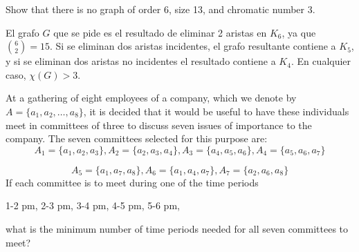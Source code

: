 \documentclass[twoside]{article}
\begin{document}
\newpage

\begin{ejercicio}{3.3}
 Show that there is no graph of order 6, size 13, and chromatic number 3.
\end{ejercicio}
\begin{solucion}
El grafo $G$ que se pide es el resultado de eliminar 2 aristas en $K_6$, ya que $\binom{6}{2}=15$. Si se eliminan dos aristas incidentes, el grafo resultante contiene a $K_5$, y si se eliminan dos aristas no incidentes el resultado contiene a $K_4$. En cualquier caso, $\chi(G)>3$. 
\end{solucion}

\newpage

\begin{ejercicio}{3.4}

At a gathering of eight employees of a company, which we denote by $A = \{a_1, a_2, \dots , a_8\}$,
it is decided that it would be useful to have these individuals meet in committees of three
to discuss seven issues of importance to the company. The seven committees selected
for this purpose are:
$$A_1 = \{a_1, a_2, a_3\}, A_2 = \{a_2, a_3, a_4\}, A_3 = \{a_4, a_5, a_6\}, A_4 = \{a_5, a_6, a_7\}$$

$$A_5 = \{a_1, a_7, a_8\}, A_6 = \{a_1, a_4, a_7\}, A_7 = \{a_2, a_6, a_8\}$$
If each committee is to meet during one of the time periods

1-2 pm, 2-3 pm, 3-4 pm, 4-5 pm, 5-6 pm,

what is the minimum number of time periods needed for all seven committees to meet?

\end{ejercicio}
\end{document}
